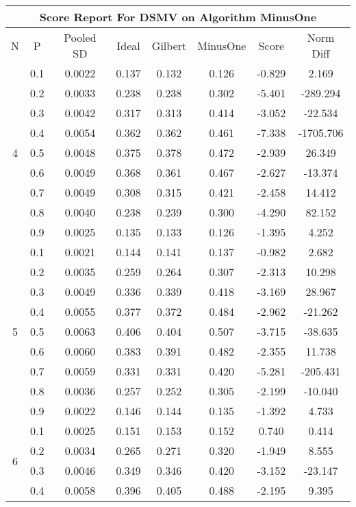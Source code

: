 \documentclass[11pt,a4paper]{report}
\begin{document}
\begin{longtable}{ | c | c || c | c | c | c | c | c | }
\hline
\multicolumn{8}{|c|}{ Score Report For DSMV on Algorithm MinusOne} \\
\hline
N & P & Pooled SD &  Ideal &  Gilbert & MinusOne  & Score & Norm Diff \\
 \hline
 \hline
 \endhead
\multirow{9}{*}{4} & 0.1 & 0.0022 & 0.137 & 0.132 & 0.126 & -0.829 & 2.169 \\
 & 0.2 & 0.0033 & 0.238 & 0.238 & 0.302 & -5.401 & -289.294 \\
 & 0.3 & 0.0042 & 0.317 & 0.313 & 0.414 & -3.052 & -22.534 \\
 & 0.4 & 0.0054 & 0.362 & 0.362 & 0.461 & -7.338 & -1705.706 \\
 & 0.5 & 0.0048 & 0.375 & 0.378 & 0.472 & -2.939 & 26.349 \\
 & 0.6 & 0.0049 & 0.368 & 0.361 & 0.467 & -2.627 & -13.374 \\
 & 0.7 & 0.0049 & 0.308 & 0.315 & 0.421 & -2.458 & 14.412 \\
 & 0.8 & 0.0040 & 0.238 & 0.239 & 0.300 & -4.290 & 82.152 \\
 & 0.9 & 0.0025 & 0.135 & 0.133 & 0.126 & -1.395 & 4.252 \\
 \hline
\multirow{9}{*}{5} & 0.1 & 0.0021 & 0.144 & 0.141 & 0.137 & -0.982 & 2.682 \\
 & 0.2 & 0.0035 & 0.259 & 0.264 & 0.307 & -2.313 & 10.298 \\
 & 0.3 & 0.0049 & 0.336 & 0.339 & 0.418 & -3.169 & 28.967 \\
 & 0.4 & 0.0055 & 0.377 & 0.372 & 0.484 & -2.962 & -21.262 \\
 & 0.5 & 0.0063 & 0.406 & 0.404 & 0.507 & -3.715 & -38.635 \\
 & 0.6 & 0.0060 & 0.383 & 0.391 & 0.482 & -2.355 & 11.738 \\
 & 0.7 & 0.0059 & 0.331 & 0.331 & 0.420 & -5.281 & -205.431 \\
 & 0.8 & 0.0036 & 0.257 & 0.252 & 0.305 & -2.199 & -10.040 \\
 & 0.9 & 0.0022 & 0.146 & 0.144 & 0.135 & -1.392 & 4.733 \\
 \hline
\multirow{9}{*}{6} & 0.1 & 0.0025 & 0.151 & 0.153 & 0.152 & 0.740 & 0.414 \\
 & 0.2 & 0.0034 & 0.265 & 0.271 & 0.320 & -1.949 & 8.555 \\
 & 0.3 & 0.0046 & 0.349 & 0.346 & 0.420 & -3.152 & -23.147 \\
 & 0.4 & 0.0058 & 0.396 & 0.405 & 0.488 & -2.195 & 9.395 \\

\end{longtable}
\end{document}
